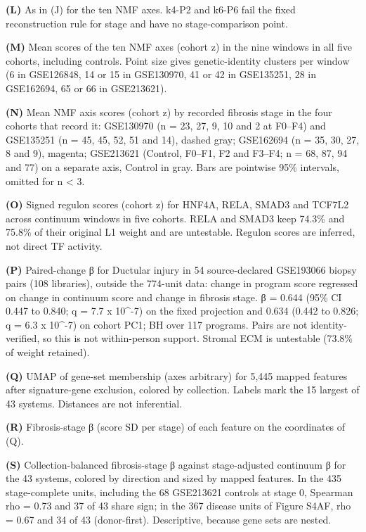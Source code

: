 \textbf{(L)} As in (J) for the ten NMF axes. k4-P2 and k6-P6 fail the fixed reconstruction rule for stage and have no stage-comparison point.

\textbf{(M)} Mean scores of the ten NMF axes (cohort z) in the nine windows in all five cohorts, including controls. Point size gives genetic-identity clusters per window (6 in GSE126848, 14 or 15 in GSE130970, 41 or 42 in GSE135251, 28 in GSE162694, 65 or 66 in GSE213621).

\textbf{(N)} Mean NMF axis scores (cohort z) by recorded fibrosis stage in the four cohorts that record it: GSE130970 (n = 23, 27, 9, 10 and 2 at F0--F4) and GSE135251 (n = 45, 45, 52, 51 and 14), dashed gray; GSE162694 (n = 35, 30, 27, 8 and 9), magenta; GSE213621 (Control, F0--F1, F2 and F3--F4; n = 68, 87, 94 and 77) on a separate axis, Control in gray. Bars are pointwise 95\% intervals, omitted for n \textless{} 3.

\textbf{(O)} Signed regulon scores (cohort z) for HNF4A, RELA, SMAD3 and TCF7L2 across continuum windows in five cohorts. RELA and SMAD3 keep 74.3\% and 75.8\% of their original L1 weight and are untestable. Regulon scores are inferred, not direct TF activity.

\textbf{(P)} Paired-change β for Ductular injury in 54 source-declared GSE193066 biopsy pairs (108 libraries), outside the 774-unit data: change in program score regressed on change in continuum score and change in fibrosis stage. β = 0.644 (95\% CI 0.447 to 0.840; q = 7.7 x 10\^{}-7) on the fixed projection and 0.634 (0.442 to 0.826; q = 6.3 x 10\^{}-7) on cohort PC1; BH over 117 programs. Pairs are not identity-verified, so this is not within-person support. Stromal ECM is untestable (73.8\% of weight retained).

\textbf{(Q)} UMAP of gene-set membership (axes arbitrary) for 5,445 mapped features after signature-gene exclusion, colored by collection. Labels mark the 15 largest of 43 systems. Distances are not inferential.

\textbf{(R)} Fibrosis-stage β (score SD per stage) of each feature on the coordinates of (Q).

\textbf{(S)} Collection-balanced fibrosis-stage β against stage-adjusted continuum β for the 43 systems, colored by direction and sized by mapped features. In the 435 stage-complete units, including the 68 GSE213621 controls at stage 0, Spearman rho = 0.73 and 37 of 43 share sign; in the 367 disease units of Figure S4AF, rho = 0.67 and 34 of 43 (donor-first). Descriptive, because gene sets are nested.


